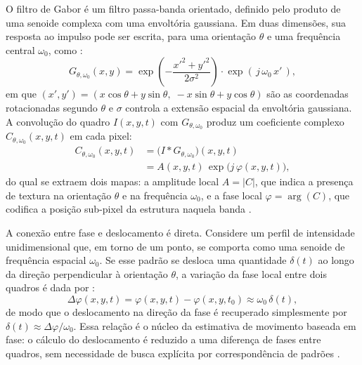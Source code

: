 \documentclass[a4paper,10pt,twocolumn]{article}
\begin{document}
O filtro de Gabor é um filtro passa-banda orientado, definido pelo produto de uma senoide complexa com uma envoltória gaussiana. Em duas dimensões, sua resposta ao impulso pode ser escrita, para uma orientação $\theta$ e uma frequência central $\omega_0$, como \cite{Wadhwa2013}:
\begin{equation}
    G_{\theta,\omega_0}(x,y) = \exp\!\left(-\frac{x'^{2} + y'^{2}}{2\sigma^{2}}\right) \cdot \exp\!\left(\, j\,\omega_0 \, x'\,\right),
    \label{eq:gabor_kernel}
\end{equation}
em que $(x', y') = (x\cos\theta + y\sin\theta,\; -x\sin\theta + y\cos\theta)$ são as coordenadas rotacionadas segundo $\theta$ e $\sigma$ controla a extensão espacial da envoltória gaussiana. A convolução do quadro $I(x,y,t)$ com $G_{\theta,\omega_0}$ produz um coeficiente complexo $C_{\theta,\omega_0}(x,y,t)$ em cada pixel:
\begin{equation}
    \begin{split}
        C_{\theta,\omega_0}(x,y,t) &= \big(I * G_{\theta,\omega_0}\big)(x,y,t) \\
        &= A(x,y,t)\,\exp\!\big(j\,\varphi(x,y,t)\big),
    \end{split}
    \label{eq:gabor_coef}
\end{equation}
do qual se extraem dois mapas: a amplitude local $A = |C|$, que indica a presença de textura na orientação $\theta$ e na frequência $\omega_0$, e a fase local $\varphi = \arg(C)$, que codifica a posição sub-pixel da estrutura naquela banda \cite{Wadhwa2013}.

A conexão entre fase e deslocamento é direta. Considere um perfil de intensidade unidimensional que, em torno de um ponto, se comporta como uma senoide de frequência espacial $\omega_0$. Se esse padrão se desloca uma quantidade $\delta(t)$ ao longo da direção perpendicular à orientação $\theta$, a variação da fase local entre dois quadros é dada por \cite{Wadhwa2013, Phase2022}:
\begin{equation}
    \Delta \varphi(x,y,t) = \varphi(x,y,t) - \varphi(x,y,t_0) \approx \omega_0 \, \delta(t),
    \label{eq:fase_deslocamento}
\end{equation}
de modo que o deslocamento na direção da fase é recuperado simplesmente por $\delta(t) \approx \Delta\varphi / \omega_0$. Essa relação é o núcleo da estimativa de movimento baseada em fase: o cálculo do deslocamento é reduzido a uma diferença de fases entre quadros, sem necessidade de busca explícita por correspondência de padrões \cite{Wadhwa2013}.
\end{document}
